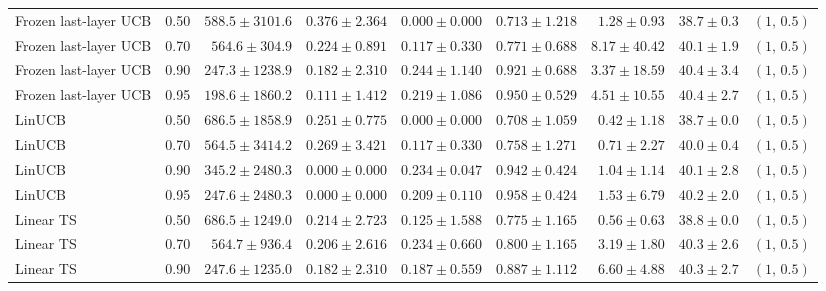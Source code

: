 {\begin{tabular}{llrrrrrrl}
\addlinespace[1pt]
Frozen last-layer UCB & 0.50 & $588.5\mathbin{\pm}3101.6$ & $0.376\mathbin{\pm}2.364$ & $0.000\mathbin{\pm}0.000$ & $0.713\mathbin{\pm}1.218$ & $1.28\mathbin{\pm}0.93$ & $38.7\mathbin{\pm}0.3$ & $(1,\,0.5)$ \\
Frozen last-layer UCB & 0.70 & $564.6\mathbin{\pm}304.9$ & $0.224\mathbin{\pm}0.891$ & $0.117\mathbin{\pm}0.330$ & $0.771\mathbin{\pm}0.688$ & $8.17\mathbin{\pm}40.42$ & $40.1\mathbin{\pm}1.9$ & $(1,\,0.5)$ \\
Frozen last-layer UCB & 0.90 & $247.3\mathbin{\pm}1238.9$ & $0.182\mathbin{\pm}2.310$ & $0.244\mathbin{\pm}1.140$ & $0.921\mathbin{\pm}0.688$ & $3.37\mathbin{\pm}18.59$ & $40.4\mathbin{\pm}3.4$ & $(1,\,0.5)$ \\
Frozen last-layer UCB & 0.95 & $198.6\mathbin{\pm}1860.2$ & $0.111\mathbin{\pm}1.412$ & $0.219\mathbin{\pm}1.086$ & $0.950\mathbin{\pm}0.529$ & $4.51\mathbin{\pm}10.55$ & $40.4\mathbin{\pm}2.7$ & $(1,\,0.5)$ \\
\addlinespace[1pt]
LinUCB & 0.50 & $686.5\mathbin{\pm}1858.9$ & $0.251\mathbin{\pm}0.775$ & $0.000\mathbin{\pm}0.000$ & $0.708\mathbin{\pm}1.059$ & $0.42\mathbin{\pm}1.18$ & $38.7\mathbin{\pm}0.0$ & $(1,\,0.5)$ \\
LinUCB & 0.70 & $564.5\mathbin{\pm}3414.2$ & $0.269\mathbin{\pm}3.421$ & $0.117\mathbin{\pm}0.330$ & $0.758\mathbin{\pm}1.271$ & $0.71\mathbin{\pm}2.27$ & $40.0\mathbin{\pm}0.4$ & $(1,\,0.5)$ \\
LinUCB & 0.90 & $345.2\mathbin{\pm}2480.3$ & $0.000\mathbin{\pm}0.000$ & $0.234\mathbin{\pm}0.047$ & $0.942\mathbin{\pm}0.424$ & $1.04\mathbin{\pm}1.14$ & $40.1\mathbin{\pm}2.8$ & $(1,\,0.5)$ \\
LinUCB & 0.95 & $247.6\mathbin{\pm}2480.3$ & $0.000\mathbin{\pm}0.000$ & $0.209\mathbin{\pm}0.110$ & $0.958\mathbin{\pm}0.424$ & $1.53\mathbin{\pm}6.79$ & $40.2\mathbin{\pm}2.0$ & $(1,\,0.5)$ \\
\addlinespace[1pt]
Linear TS & 0.50 & $686.5\mathbin{\pm}1249.0$ & $0.214\mathbin{\pm}2.723$ & $0.125\mathbin{\pm}1.588$ & $0.775\mathbin{\pm}1.165$ & $0.56\mathbin{\pm}0.63$ & $38.8\mathbin{\pm}0.0$ & $(1,\,0.5)$ \\
Linear TS & 0.70 & $564.7\mathbin{\pm}936.4$ & $0.206\mathbin{\pm}2.616$ & $0.234\mathbin{\pm}0.660$ & $0.800\mathbin{\pm}1.165$ & $3.19\mathbin{\pm}1.80$ & $40.3\mathbin{\pm}2.6$ & $(1,\,0.5)$ \\
Linear TS & 0.90 & $247.6\mathbin{\pm}1235.0$ & $0.182\mathbin{\pm}2.310$ & $0.187\mathbin{\pm}0.559$ & $0.887\mathbin{\pm}1.112$ & $6.60\mathbin{\pm}4.88$ & $40.3\mathbin{\pm}2.7$ & $(1,\,0.5)$ \\

\end{tabular}}

